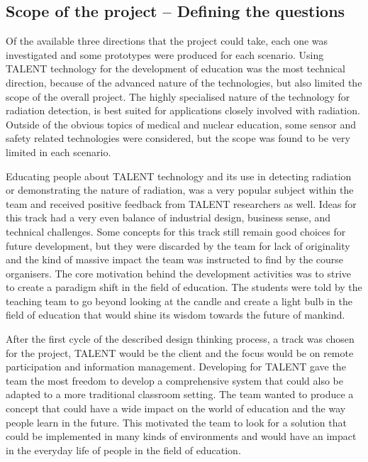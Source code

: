 \documentclass[english,12pt,a4paper,pdftex]{article}
\begin{document}
\subsection{Scope of the project -- Defining the questions}

Of the available three directions that the project could take, each one was investigated and some prototypes were produced for each scenario. Using TALENT technology for the development of education was the most technical direction, because of the advanced nature of the technologies, but also limited the scope of the overall project. The highly specialised nature of the technology for radiation detection, is best suited for applications closely involved with radiation. Outside of the obvious topics of medical and nuclear education, some sensor and safety related technologies were considered, but the scope was found to be very limited in each scenario.

Educating people about TALENT technology and its use in detecting radiation or demonstrating the nature of radiation, was a very popular subject within the team and received positive feedback from TALENT researchers as well. Ideas for this track had a very even balance of industrial design, business sense, and technical challenges. Some concepts for this track still remain good choices for future development, but they were discarded by the team for lack of originality and the kind of massive impact the team was instructed to find by the course organisers. The core motivation behind the development activities was to strive to create a paradigm shift in the field of education. The students were told by the teaching team to go beyond looking at the candle and create a light bulb in the field of education that would shine its wisdom towards the future of mankind.

After the first cycle of the described design thinking process, a track was chosen for the project, TALENT would be the client and the focus would be on remote participation and information management. Developing for TALENT gave the team the most freedom to develop a comprehensive system that could also be adapted to a more traditional classroom setting. The team wanted to produce a concept that could have a wide impact on the world of education and the way people learn in the future. This motivated the team to look for a solution that could be implemented in many kinds of environments and would have an impact in the everyday life of people in the field of education.
\end{document}
